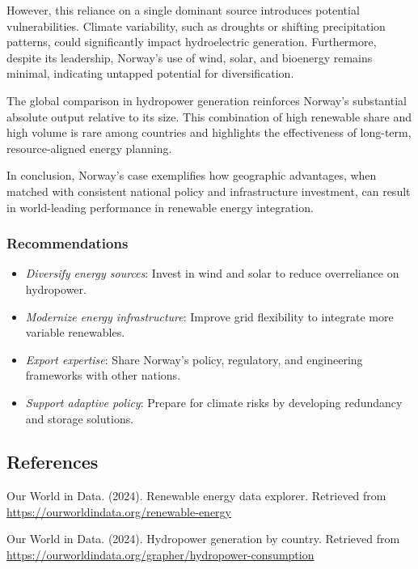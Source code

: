 \documentclass[
  letterpaper,
  DIV=11,
  numbers=noendperiod]{scrartcl}
\providecommand{\tightlist}{%
  \setlength{\itemsep}{0pt}\setlength{\parskip}{0pt}}\usepackage{longtable,booktabs,array}
\begin{document}
However, this reliance on a single dominant source introduces potential
vulnerabilities. Climate variability, such as droughts or shifting
precipitation patterns, could significantly impact hydroelectric
generation. Furthermore, despite its leadership, Norway's use of wind,
solar, and bioenergy remains minimal, indicating untapped potential for
diversification.

The global comparison in hydropower generation reinforces Norway's
substantial absolute output relative to its size. This combination of
high renewable share and high volume is rare among countries and
highlights the effectiveness of long-term, resource-aligned energy
planning.

In conclusion, Norway's case exemplifies how geographic advantages, when
matched with consistent national policy and infrastructure investment,
can result in world-leading performance in renewable energy integration.

\subsubsection{Recommendations}\label{recommendations}

\begin{itemize}
\tightlist
\item
  \emph{Diversify energy sources}: Invest in wind and solar to reduce
  overreliance on hydropower.
\item
  \emph{Modernize energy infrastructure}: Improve grid flexibility to
  integrate more variable renewables.
\item
  \emph{Export expertise}: Share Norway's policy, regulatory, and
  engineering frameworks with other nations.
\item
  \emph{Support adaptive policy}: Prepare for climate risks by
  developing redundancy and storage solutions.
\end{itemize}

\subsection{References}\label{references}

Our World in Data. (2024). Renewable energy data explorer. Retrieved
from \url{https://ourworldindata.org/renewable-energy}

Our World in Data. (2024). Hydropower generation by country. Retrieved
from \url{https://ourworldindata.org/grapher/hydropower-consumption}
\end{document}
